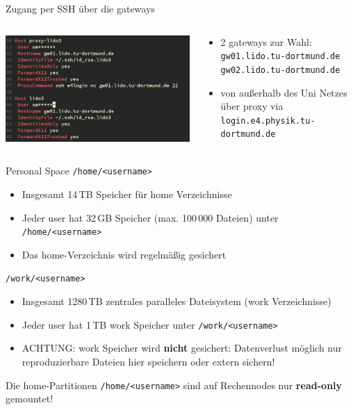 \begin{frame}{Zugang per SSH über die gateways}
  \begin{columns}
    \begin{column}{0.475\textwidth}
      \includegraphics[width=\textwidth]{figs/ssh_conf.png}
    \end{column}
    \begin{column}{0.475\textwidth}
      \begin{itemize}
        \item 2 gateways zur Wahl: \texttt{gw01.lido.tu-dortmund.de} \texttt{gw02.lido.tu-dortmund.de}
        \item von außerhalb des Uni Netzes über proxy via \texttt{login.e4.physik.tu-dortmund.de}
      \end{itemize}
    \end{column}
  \end{columns}
\end{frame}

\begin{frame}{Personal Space}
  \texttt{/home/<username>}
  \begin{itemize}
    \item Insgesamt 14\,TB Speicher für home Verzeichnisse
    \item Jeder user hat 32\,GB Speicher (max. 100\,000 Dateien) unter \texttt{/home/<username>}
    \item Das home-Verzeichnis wird regelmäßig gesichert
  \end{itemize}
  \texttt{/work/<username>}
  \begin{itemize}
    \item Insgesamt 1280\,TB zentrales paralleles Dateisystem (work Verzeichnisse)
    \item Jeder user hat 1\,TB work Speicher unter \texttt{/work/<username>}
    \item ACHTUNG: work Speicher wird \textbf{nicht} gesichert: Datenverlust möglich \rightarrow nur reproduzierbare Dateien hier speichern oder extern sichern!
  \end{itemize}
  Die home-Partitionen \texttt{/home/<username>} sind auf Rechennodes nur \textbf{read-only} gemountet!
\end{frame}

